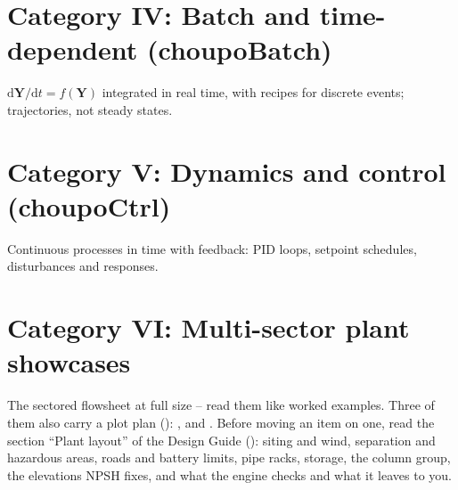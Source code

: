\documentclass[11pt,a4paper]{article}
\begin{document}
\clearpage
\section*{Category IV: Batch and time-dependent (choupoBatch)}
$\mathrm{d}\mathbf{Y}/\mathrm{d}t = f(\mathbf{Y})$ integrated in real time,
with recipes for discrete events; trajectories, not steady states.


\clearpage
\section*{Category V: Dynamics and control (choupoCtrl)}
Continuous processes in time with feedback: PID loops, setpoint schedules,
disturbances and responses.


\clearpage
\section*{Category VI: Multi-sector plant showcases}
The sectored flowsheet at full size -- read them like worked examples.
Three of them also carry a plot plan ():
,  and
.  Before moving an item on one, read the
section ``Plant layout'' of the Design Guide ():
siting and wind, separation and hazardous areas, roads and battery limits,
pipe racks, storage, the column group, the elevations NPSH fixes, and
what the engine checks and what it leaves to you.

\end{document}
